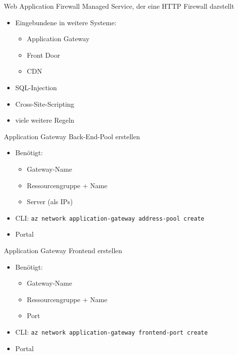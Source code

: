 \begin{flashcard}[Definition]{Web Application Firewall}
    Managed Service, der eine HTTP Firewall darstellt
    \begin{itemize}
        \item Eingebundene in weitere Systeme:
            \begin{itemize}
                \item Application Gateway
                \item Front Door
                \item CDN
            \end{itemize}
        \item SQL-Injection
        \item Cross-Site-Scripting
        \item viele weitere Regeln
    \end{itemize}
\end{flashcard}

\begin{flashcard}[Definition]{Application Gateway Back-End-Pool erstellen}
    \begin{itemize}
        \item Benötigt:
            \begin{itemize}
                \item Gateway-Name
                \item Ressourcengruppe + Name
                \item Server (als IPs)
            \end{itemize}
        \item CLI: \texttt{az network application-gateway address-pool create}
        \item Portal
    \end{itemize}
\end{flashcard}

\begin{flashcard}[Definition]{Application Gateway Frontend erstellen}
    \begin{itemize}
        \item Benötigt:
            \begin{itemize}
                \item Gateway-Name
                \item Ressourcengruppe + Name
                \item Port
            \end{itemize}
        \item CLI: \texttt{az network application-gateway frontend-port create}
        \item Portal
    \end{itemize}
\end{flashcard}

